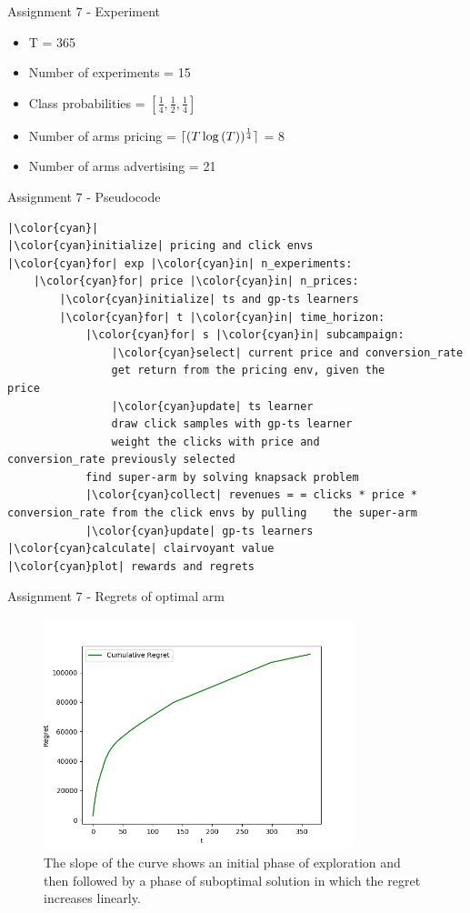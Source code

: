 \documentclass[11pt]{beamer}
\DeclarePairedDelimiter{\ceil}{\lceil}{\rceil}
\begin{document}
\begin{frame}{Assignment 7 - Experiment}
\begin{itemize}
\item T = 365
\item Number of experiments = 15
\item Class probabilities = \( \left[ \frac{1}{4}, \frac{1}{2}, \frac{1}{4} \right] \)
\item Number of arms pricing = $\ceil{(T \log{(T)})^{\frac{1}{4}}}$ = 8
\item Number of arms advertising = 21
\end{itemize}
\end{frame}

\begin{frame}[fragile]{Assignment 7 - Pseudocode}
\begin{lstlisting}
|\color{cyan}|
|\color{cyan}initialize| pricing and click envs
|\color{cyan}for| exp |\color{cyan}in| n_experiments:
	|\color{cyan}for| price |\color{cyan}in| n_prices:
		|\color{cyan}initialize| ts and gp-ts learners 
		|\color{cyan}for| t |\color{cyan}in| time_horizon:
			|\color{cyan}for| s |\color{cyan}in| subcampaign:
				|\color{cyan}select| current price and conversion_rate 
				get return from the pricing env, given the				price
				|\color{cyan}update| ts learner
				draw click samples with gp-ts learner
				weight the clicks with price and                   conversion_rate previously selected
			find super-arm by solving knapsack problem
			|\color{cyan}collect| revenues = = clicks * price *             conversion_rate from the click envs by pulling    the super-arm
			|\color{cyan}update| gp-ts learners 
|\color{cyan}calculate| clairvoyant value
|\color{cyan}plot| rewards and regrets
\end{lstlisting}
\end{frame}

\begin{frame}{Assignment 7 - Regrets of optimal arm}
\begin{figure}[hbtp]
\centering
\includegraphics[width=0.8\textwidth]{images/assignment_7_regrets_arm_3_cum_regret.png}
\caption{The slope of the curve shows an initial phase of exploration and then followed by a phase of suboptimal solution in which the regret increases linearly.}
\end{figure}
\end{frame}
\end{document}

